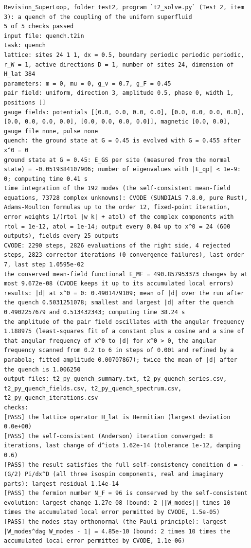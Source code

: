 \documentclass[
  10pt,
]{article}
\begin{document}
\begin{verbatim}
Revision_SuperLoop, folder test2, program `t2_solve.py` (Test 2, item 3): a quench of the coupling of the uniform superfluid
5 of 5 checks passed
input file: quench.t2in
task: quench
lattice: sites 24 1 1, dx = 0.5, boundary periodic periodic periodic, r_W = 1, active directions D = 1, number of sites 24, dimension of H_lat 384
parameters: m = 0, mu = 0, g_v = 0.7, g_F = 0.45
pair field: uniform, direction 3, amplitude 0.5, phase 0, width 1, positions []
gauge fields: potentials [[0.0, 0.0, 0.0, 0.0], [0.0, 0.0, 0.0, 0.0], [0.0, 0.0, 0.0, 0.0], [0.0, 0.0, 0.0, 0.0]], magnetic [0.0, 0.0], gauge file none, pulse none
quench: the ground state at G = 0.45 is evolved with G = 0.455 after x^0 = 0
ground state at G = 0.45: E_GS per site (measured from the normal state) = -0.0519384107906; number of eigenvalues with |E_qp| < 1e-9: 0; computing time 0.41 s
time integration of the 192 modes (the self-consistent mean-field equations, 73728 complex unknowns): CVODE (SUNDIALS 7.8.0, pure Rust), Adams-Moulton formulas up to the order 12, fixed-point iteration, error weights 1/(rtol |w_k| + atol) of the complex components with rtol = 1e-12, atol = 1e-14; output every 0.04 up to x^0 = 24 (600 outputs), fields every 25 outputs
CVODE: 2290 steps, 2826 evaluations of the right side, 4 rejected steps, 2823 corrector iterations (0 convergence failures), last order 7, last step 1.0595e-02
the conserved mean-field functional E_MF = 490.857953373 changes by at most 9.672e-08 (CVODE keeps it up to its accumulated local errors)
results: |d| at x^0 = 0: 0.4901479109; mean of |d| over the run after the quench 0.5031251078; smallest and largest |d| after the quench 0.4902257679 and 0.513432343; computing time 38.24 s
the amplitude of the pair field oscillates with the angular frequency 1.188975 (least-squares fit of a constant plus a cosine and a sine of that angular frequency of x^0 to |d| for x^0 > 0, the angular frequency scanned from 0.2 to 6 in steps of 0.001 and refined by a parabola; fitted amplitude 0.00707867); twice the mean of |d| after the quench is 1.006250
output files: t2_py_quench_summary.txt, t2_py_quench_series.csv, t2_py_quench_fields.csv, t2_py_quench_spectrum.csv, t2_py_quench_iterations.csv
checks:
[PASS] the lattice operator H_lat is Hermitian (largest deviation 0.0e+00)
[PASS] the self-consistent (Anderson) iteration converged: 8 iterations, last change of d^iota 1.62e-14 (tolerance 1e-12, damping 0.6)
[PASS] the result satisfies the full self-consistency condition d = -(G/2) Pi/dx^D (all three isospin components, real and imaginary parts): largest residual 1.14e-14
[PASS] the fermion number N_F = 96 is conserved by the self-consistent evolution: largest change 1.27e-08 (bound: 2 ||W_modes|| times 10 times the accumulated local error permitted by CVODE, 1.5e-05)
[PASS] the modes stay orthonormal (the Pauli principle): largest |W_modes^dag W_modes - 1| = 4.85e-10 (bound: 2 times 10 times the accumulated local error permitted by CVODE, 1.1e-06)
\end{verbatim}
\end{document}
